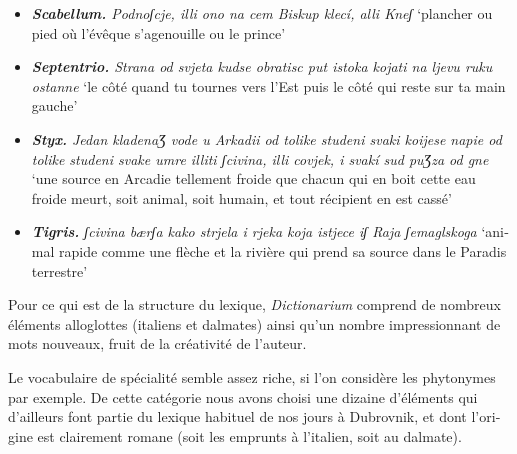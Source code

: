 \documentclass[output=paper,colorlinks,citecolor=brown,arabicfont,chinesefont,booklanguage=french]{langscibook}
\begin{document}
\begin{otherlanguage}{french}
\begin{itemize}
    \item \emph{\textbf{Scabellum.} Podnoʃcje, illi ono na cem Biskup klecí, alli Kneʃ} ‘plancher ou pied où l’évêque s’agenouille ou le prince’
    \item \emph{\textbf{Septentrio.} Strana od svjeta kudse obratisc put istoka kojati na ljevu ruku ostanne} ‘le côté quand tu tournes vers l’Est puis le côté qui reste sur ta main gauche’
    \item \emph{\textbf{Styx.} Jedan kladenaƷ vode u Arkadii od tolike studeni svaki koijese napie od tolike studeni svake umre illiti ʃcivina, illi covjek, i svakí sud puƷza od gne} ‘une source en Arcadie tellement froide que chacun qui en boit cette eau froide meurt, soit animal, soit humain, et tout récipient en est cassé’
    \item \emph{\textbf{Tigris.} ʃcivina bærʃa kako strjela i rjeka koja istjece iʃ Raja ʃemaglskoga} ‘animal rapide comme une flèche et la rivière qui prend sa source dans le Paradis terrestre’
\end{itemize}

Pour ce qui est de la structure du lexique, \emph{Dictionarium} comprend de nombreux éléments alloglottes (italiens et dalmates) ainsi qu’un nombre impressionnant de mots nouveaux, fruit de la créativité de l’auteur.

Le vocabulaire de spécialité semble assez riche, si l’on considère les phytonymes par exemple. De cette catégorie nous avons choisi une dizaine d’éléments qui d’ailleurs font partie du lexique habituel de nos jours à Dubrovnik, et dont l’origine est clairement romane (soit les emprunts à l’italien, soit au dalmate).


\end{otherlanguage}
\end{document}
